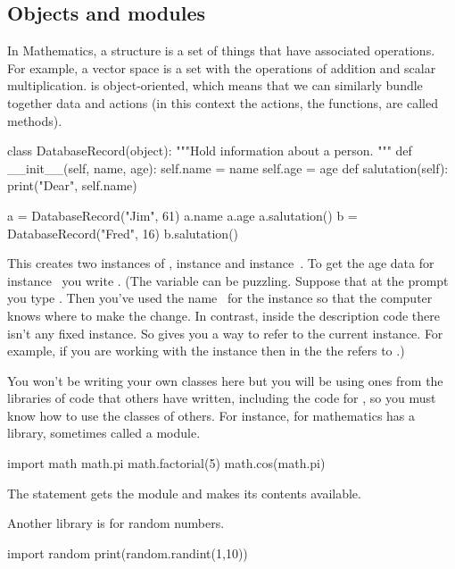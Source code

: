 \subsection{Objects and modules}
In Mathematics, a structure is a set of things that have associated operations.
For example, a vector space is a set with the operations
of addition and scalar multiplication.
\python{} is object-oriented, which means that we can similarly bundle
together data and actions (in this context the actions, the functions, 
are called methods).
\begin{pythonconsole}
class DatabaseRecord(object):
    """Hold information about a person.
    """
    def __init__(self, name, age):
        self.name = name
        self.age = age
    def salutation(self):
        print("Dear", self.name)

a = DatabaseRecord("Jim", 61)
a.name
a.age
a.salutation()
b = DatabaseRecord("Fred", 16)
b.salutation()
\end{pythonconsole}
\noindent
This creates two instances of 
, instance  and
instance~.
To get the age data for instance~
you write 
.
(The \protect{} variable 
can  be puzzling.
Suppose that at the prompt you type .
Then you've used the name~ 
for the instance so that the computer knows where to
make the change.
In contrast,
inside the  description code there isn't any fixed instance. 
So  gives you a way to refer to the current instance. 
For example, if you are working with the instance  then 
in the  the  refers
to .)

You won't be writing your own classes here 
but you will be using ones from
the libraries of code that others have written, including the
code for \Sage, so you must know how to use the classes of others. 
For instance, for mathematics \python{} has a library, 
sometimes called a module.
\begin{pythonconsole}
import math
math.pi
math.factorial(5)
math.cos(math.pi)
\end{pythonconsole}
\noindent
The  statement gets the module and makes
its contents available.

Another library is for random numbers.
\begin{pythonconsole}
import random
print(random.randint(1,10))

\end{pythonconsole}



